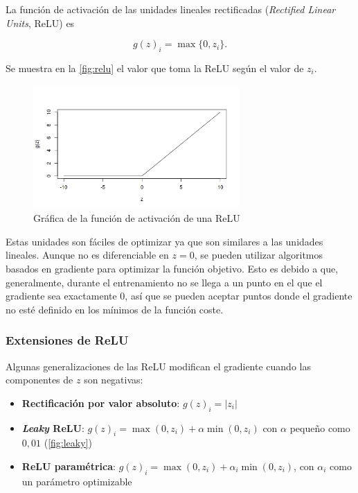 La función de activación de las unidades lineales rectificadas
(\emph{Rectified Linear Units}, ReLU) es

\begin{equation}
g(z)_i=\max\{0,z_i\}.
\end{equation}

Se muestra en la \autoref{fig:relu} el valor que toma la ReLU según el valor de $z_i$.

\begin{figure}[hbtp]
  \centering
  \includegraphics[width=0.7\textwidth]{images/relu.png}
  \caption[ReLU]{Gráfica de la función de activación de una ReLU}
  \label{fig:relu}
\end{figure}

Estas unidades son fáciles de optimizar ya que son similares a las
unidades lineales. Aunque no es diferenciable en \(z=0\), se pueden
utilizar algoritmos basados en gradiente para optimizar la función
objetivo. Esto es debido a que, generalmente, durante el entrenamiento
no se llega a un punto en el que el gradiente sea exactamente $0$, así que
se pueden aceptar puntos donde el gradiente no esté definido en los
mínimos de la función coste.

\subsubsection{Extensiones de ReLU}\label{extensiones-de-relu}

Algunas generalizaciones de las ReLU modifican el gradiente cuando las
componentes de \(z\) son negativas:

\begin{itemize}
\tightlist
\item
  \textbf{Rectificación por valor absoluto}:
  \(g(z)_{i}=\lvert z_{i} \rvert\)
\item
  \textbf{\emph{Leaky} ReLU}: \(g(z)_i=\max(0,z_i)+\alpha\min(0,z_i)\)
  con \(\alpha\) pequeño como \(0,01\) (\autoref{fig:leaky})
\item
  \textbf{ReLU paramétrica}: \(g(z)_i=\max(0,z_i)+\alpha_i\min(0,z_i)\),
  con \(\alpha_i\) como un parámetro optimizable
\end{itemize}

